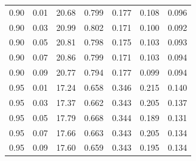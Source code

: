 \begin{table}[htbp]
\begin{tabular}{ccccccc}
0.90 & 0.01 & 20.68 & 0.799 & 0.177 & 0.108 & 0.096 \\
0.90 & 0.03 & 20.99 & 0.802 & 0.171 & 0.100 & 0.092 \\
0.90 & 0.05 & 20.81 & 0.798 & 0.175 & 0.103 & 0.093 \\
0.90 & 0.07 & 20.86 & 0.799 & 0.171 & 0.103 & 0.094 \\
0.90 & 0.09 & 20.77 & 0.794 & 0.177 & 0.099 & 0.094 \\
0.95 & 0.01 & 17.24 & 0.658 & 0.346 & 0.215 & 0.140 \\
0.95 & 0.03 & 17.37 & 0.662 & 0.343 & 0.205 & 0.137 \\
0.95 & 0.05 & 17.79 & 0.668 & 0.344 & 0.189 & 0.131 \\
0.95 & 0.07 & 17.66 & 0.663 & 0.343 & 0.205 & 0.134 \\
0.95 & 0.09 & 17.60 & 0.659 & 0.343 & 0.195 & 0.134 \\
\bottomrule
\end{tabular}
\end{table}

